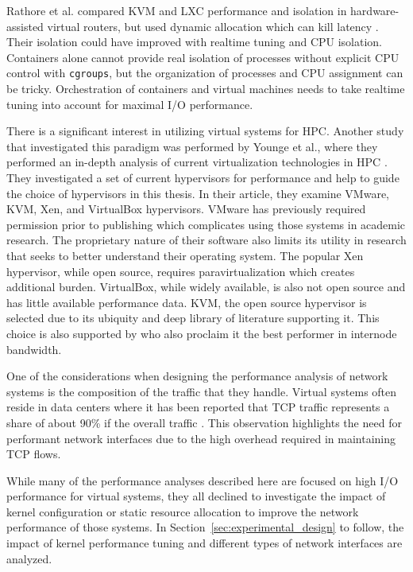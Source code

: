 Rathore et al. compared KVM and LXC performance and isolation in hardware-assisted virtual routers, but used dynamic allocation which can kill latency \autocite{rathore2013kvm}.
Their isolation could have improved with realtime tuning and CPU isolation.  
Containers alone cannot provide real isolation of processes without explicit CPU control with \texttt{cgroups}, but the organization of processes and CPU assignment can be tricky.
Orchestration of containers and virtual machines needs to take realtime tuning into account for maximal I/O performance.

There is a significant interest in utilizing virtual systems for HPC.  Another study that investigated this paradigm was performed by Younge et al., where they performed an in-depth analysis of current virtualization technologies in HPC \autocite{_younge_1}.
They investigated a set of current hypervisors for performance and help to guide the choice of hypervisors in this thesis. 
In their article, they examine VMware, KVM, Xen, and VirtualBox hypervisors. 
VMware has previously required permission prior to publishing which complicates using those systems in academic research.  
The proprietary nature of their software also limits its utility in research that seeks to better understand their operating system.  
The popular Xen hypervisor, while open source, requires paravirtualization which creates additional burden.
VirtualBox, while widely available, is also not open source and has little available performance data.  
KVM, the open source hypervisor is selected due to its ubiquity and deep library of literature supporting it.
This choice is also supported by \autocite{_younge_1} who also proclaim it the best performer in internode bandwidth.  

One of the considerations when designing the performance analysis of network systems is the composition of the traffic that they handle.  
Virtual systems often reside in data centers where it has been reported that TCP traffic represents a share of about 90\% if the overall traffic \autocite{haTCPCloud2013}.
This observation highlights the need for performant network interfaces due to the high overhead required in maintaining TCP flows.

While many of the performance analyses described here are focused on high I/O performance for virtual systems, they all declined to investigate the impact of kernel configuration or static resource allocation to improve the network performance of those systems.  
In Section~\ref{sec:experimental_design} to follow, the impact of kernel performance tuning and different types of network interfaces are analyzed.  



\nocite{_dpdk_1, _adams_1, _chowdhury_1, seo2014performance, gomes2014performance, kivity2014osv, wang2011understanding}

